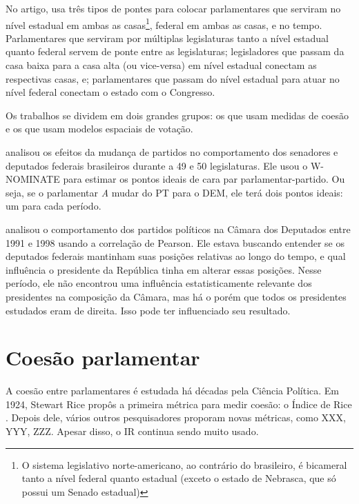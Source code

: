 No artigo,  usa três tipos de pontes para colocar
parlamentares que serviram no nível estadual em ambas as casas\footnote{O
sistema legislativo norte-americano, ao contrário do brasileiro, é bicameral
tanto a nível federal quanto estadual (exceto o estado de Nebrasca, que só
possui um Senado estadual)}, federal em ambas as casas, e no tempo.
Parlamentares que serviram por múltiplas legislaturas tanto a nível estadual
quanto federal servem de ponte entre as legislaturas; legisladores que passam
da casa baixa para a casa alta (ou vice-versa) em nível estadual conectam as
respectivas casas, e; parlamentares que passam do nível estadual para atuar no
nível federal conectam o estado com o Congresso.

Os trabalhos se dividem em dois grandes grupos: os que usam medidas de coesão e
os que usam modelos espaciais de votação.


 analisou os efeitos da mudança de partidos no
comportamento dos senadores e deputados federais brasileiros durante a
49\textordfeminine{} e 50\textordfeminine{} legislaturas. Ele usou o W-NOMINATE
para estimar os pontos ideais de cara par parlamentar-partido. Ou seja, se o
parlamentar \emph{A} mudar do PT para o DEM, ele terá dois pontos ideais: um
para cada período.

 analisou o comportamento dos partidos políticos na
Câmara dos Deputados entre 1991 e 1998 usando a correlação de Pearson. Ele
estava buscando entender se os deputados federais mantinham suas posições
relativas ao longo do tempo, e qual influência o presidente da República tinha
em alterar essas posições. Nesse período, ele não encontrou uma influência
estatisticamente relevante dos presidentes na composição da Câmara, mas há o
porém que todos os presidentes estudados eram de direita. Isso pode ter
influenciado seu resultado.

\section{Coesão parlamentar}

A coesão entre parlamentares é estudada há décadas pela Ciência Política. Em 1924, Stewart Rice propôs a primeira métrica para medir coesão: o Índice de Rice \cite{Rice1924}. Depois dele, vários outros pesquisadores proporam novas métricas, como XXX, YYY, ZZZ. Apesar disso, o IR continua sendo muito usado.

